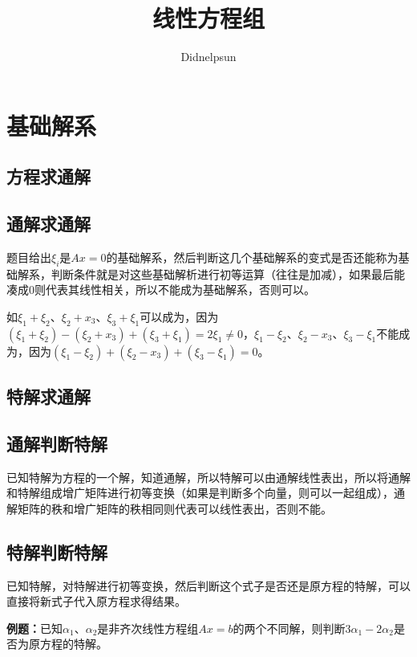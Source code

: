 \documentclass[UTF8, 12pt]{ctexart}
\author{Didnelpsun}
\title{线性方程组}
\date{}
\begin{document}
\maketitle
\pagestyle{empty}
\thispagestyle{empty}
\tableofcontents
\thispagestyle{empty}
\newpage
\pagestyle{plain}
\setcounter{page}{1}
\section{基础解系}

\subsection{方程求通解}

\subsection{通解求通解}

题目给出$\xi_i$是$Ax=0$的基础解系，然后判断这几个基础解系的变式是否还能称为基础解系，判断条件就是对这些基础解析进行初等运算（往往是加减），如果最后能凑成0则代表其线性相关，所以不能成为基础解系，否则可以。

如$\xi_1+\xi_2$、$\xi_2+x_3$、$\xi_3+\xi_1$可以成为，因为$(\xi_1+\xi_2)-(\xi_2+x_3)+(\xi_3+\xi_1)=2\xi_1\neq0$，$\xi_1-\xi_2$、$\xi_2-x_3$、$\xi_3-\xi_1$不能成为，因为$(\xi_1-\xi_2)+(\xi_2-x_3)+(\xi_3-\xi_1)=0$。

\subsection{特解求通解}

\subsection{通解判断特解}

已知特解为方程的一个解，知道通解，所以特解可以由通解线性表出，所以将通解和特解组成增广矩阵进行初等变换（如果是判断多个向量，则可以一起组成），通解矩阵的秩和增广矩阵的秩相同则代表可以线性表出，否则不能。

\subsection{特解判断特解}

已知特解，对特解进行初等变换，然后判断这个式子是否还是原方程的特解，可以直接将新式子代入原方程求得结果。

\textbf{例题：}已知$\alpha_1$、$\alpha_2$是非齐次线性方程组$Ax=b$的两个不同解，则判断$3\alpha_1-2\alpha_2$是否为原方程的特解。
\end{document}
